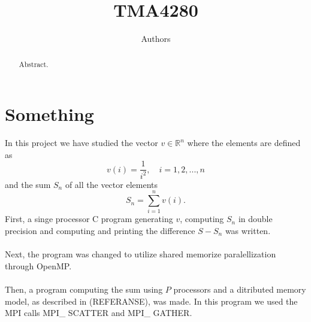\documentclass{article}
\title{TMA4280}
\author{Authors}
\begin{document}
\maketitle

\begin{abstract}
Abstract. 
\end{abstract}

\newpage
\section*{Something}
In this project we have studied the vector $v \in \mathbb{R}^n$ where the elements are defined as 
\begin{equation}
\label{vdefinition}
	v(i) =\frac{1}{i^2},\quad i = 1,2,...,n
\end{equation}
and the sum $S_n$ of all the vector elements 
\begin{equation}
\label{Sdefinition}
	S_n = \sum_{i=1}^n v(i).
\end{equation}
First, a singe processor C program generating $v$, computing $S_n$ in double precision and computing and printing the difference $S - S_n$ was written. 
\\\\
Next, the program was changed to utilize shared memorize paralellization through OpenMP. 
\\\\
Then, a program computing the sum using $P	$ processors and a ditributed memory model, as described in (REFERANSE), was made. In this program we used the MPI calls MPI\_ SCATTER and MPI\_ GATHER. 
\end{document}
